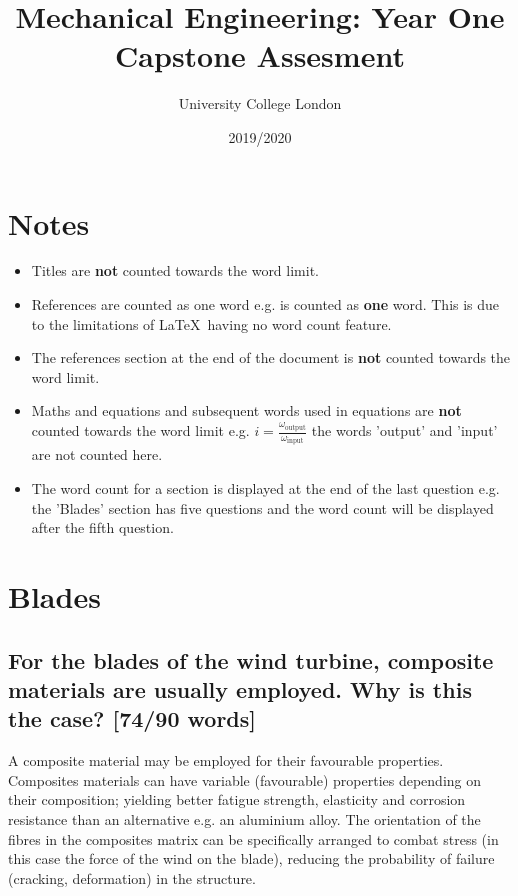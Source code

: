 \documentclass[12pt]{article}
\newcommand{\citeprimsec}[2]{\citep[][cited by \citealp{#2}]{#1}}
\numberwithin{equation}{section}
\begin{document}
\title{Mechanical Engineering: Year One Capstone Assesment}
\date{2019/2020}
\author{University College London}
\maketitle
\begin{flushleft}

\section*{Notes}
\begin{itemize}
  \item Titles are \textbf{not} counted towards the word limit.
  \item References are counted as one word e.g. \citeprimsec{windTurbineMaterial2}{windTurbineMaterial} is counted as \textbf{one} word. This is due to the limitations of \LaTeX \ having no word count feature.
  \item The references section at the end of the document is \textbf{not} counted towards the word limit.
  \item Maths and equations and subsequent words used in equations are \textbf{not} counted towards the word limit e.g. $i = \frac{\omega_{\textrm{output}}}{\omega_{\textrm{input}}}$ the words 'output' and 'input' are not counted here.
  \item The word count for a section is displayed at the end of the last question e.g. the 'Blades' section has five questions and the word count will be displayed after the fifth question.  
\end{itemize}

\section{Blades}
\subsection{For the blades of the wind turbine, composite materials are usually employed. Why is this the case? [74/90 words]}
A composite material may be employed for their favourable properties. Composites materials can have variable (favourable) properties depending on their composition; yielding better fatigue strength, elasticity and corrosion resistance than an alternative e.g. an aluminium alloy. The orientation of the fibres in the composites matrix can be specifically arranged to combat stress (in this case the force of the wind on the blade), reducing the probability of failure (cracking, deformation) in the structure.


\end{flushleft}
\end{document}
